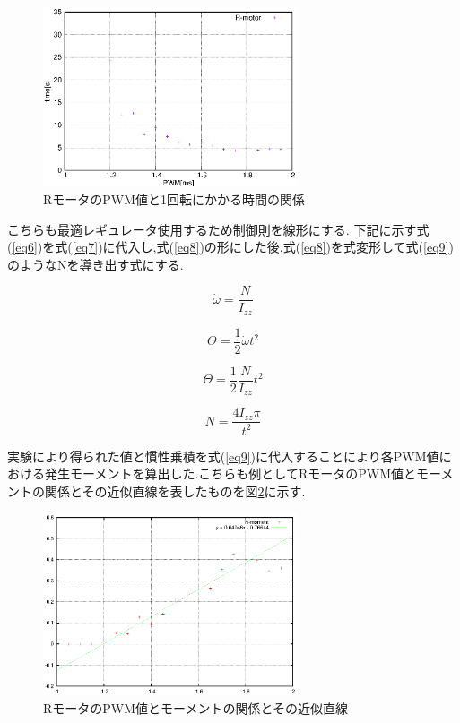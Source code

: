 \documentclass[12pt,oneside]{sotsuken_paper}
\begin{document}
\begin{figure}[htbp]
	\begin{center}
		\includegraphics[width=75mm]{image/moment/moment-time-R.eps}
		\caption{RモータのPWM値と1回転にかかる時間の関係}
		\label{fig:moment-time-R}
	\end{center}
\end{figure}

こちらも最適レギュレータ使用するため制御則を線形にする.
下記に示す式(\ref{eq6})を式(\ref{eq7})に代入し,式(\ref{eq8})の形にした後,式(\ref{eq8})を式変形して式(\ref{eq9})のようなNを導き出す式にする.

\begin{equation}
	\dot{\omega} = \frac{N}{I_{zz}}
	\label{eq6}
\end{equation}

\begin{equation}
	\Theta = \frac{1}{2}\dot{\omega}{t^2}
	\label{eq7}
\end{equation}

\begin{equation}
	\Theta = \frac{1}{2}\frac{N}{I_{zz}}{t^2}
	\label{eq8}
\end{equation}

\begin{equation}
	N = \frac{4{I_{zz}}\pi}{t^2}
	\label{eq9}
\end{equation}
 
実験により得られた値と慣性乗積を式(\ref{eq9})に代入することにより各PWM値における発生モーメントを算出した.こちらも例としてRモータのPWM値とモーメントの関係とその近似直線を表したものを図\ref{fig:moment-R}に示す.

\begin{figure}[htbp]
	\begin{center}
		\includegraphics[width=75mm]{image/moment/moment.eps}
		\caption{RモータのPWM値とモーメントの関係とその近似直線}
		\label{fig:moment-R}
	\end{center}
\end{figure}
\end{document}
